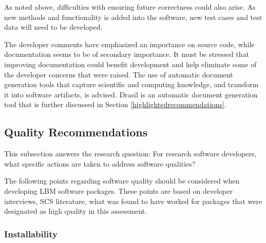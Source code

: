 \documentclass[12pt, notitlepage]{article}
\begin{document}
As noted above, difficulties with ensuring future correctness could also arise. As new methods and functionality is added into the software, new test cases and test data will need to be developed.

The developer comments have emphasized an importance on source code, while documentation seems to be of secondary importance. It must be stressed that improving documentation could benefit development and help eliminate some of the developer concerns that were raised. The use of automatic document generation tools that capture scientific and computing knowledge, and transform it into software artifacts, is advised. Drasil is an automatic document generation tool that is further discussed in Section \ref{highlightedrecommendations}.

\subsection{Quality Recommendations}\label{qualityrecommentations}

This subsection answers the research question: For research software developers, what specific actions are taken to address software qualities?

The following points regarding software quality should be considered when developing LBM software packages. These points are based on developer interviews, SCS literature, what was found to have worked for packages that were designated as high quality in this assessment.

\subsubsection{Installability}
\end{document}
